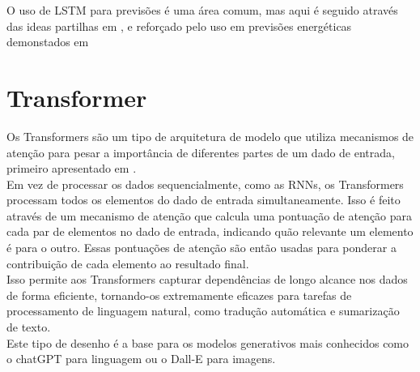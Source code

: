 O uso de LSTM para previsões é uma área comum, mas aqui é seguido através das ideas partilhas em \cite{Hewamalage2021}, e reforçado pelo uso em previsões energéticas demonstados em \cite{Costa2022} \\


\section{Transformer\label{se:transformer_sec}}

Os Transformers são um tipo de arquitetura de modelo que utiliza mecanismos de atenção para pesar a importância de diferentes partes de um dado de entrada, primeiro apresentado em \cite{Vaswani2017}.\\
Em vez de processar os dados sequencialmente, como as RNNs, os Transformers processam todos os elementos do dado de entrada simultaneamente. Isso é feito através de um mecanismo de atenção que calcula uma pontuação de atenção para cada par de elementos no dado de entrada, indicando quão relevante um elemento é para o outro. Essas pontuações de atenção são então usadas para ponderar a contribuição de cada elemento ao resultado final. \\
Isso permite aos Transformers capturar dependências de longo alcance nos dados de forma eficiente, tornando-os extremamente eficazes para tarefas de processamento de linguagem natural, como tradução automática e sumarização de texto.\\
Este tipo de desenho é a base para os modelos generativos mais conhecidos como o chatGPT para linguagem ou o Dall-E para imagens.\\

















